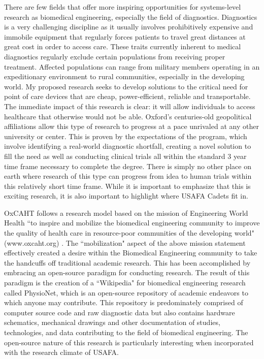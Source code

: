 \documentclass{article}
\begin{document}
There are few fields that offer more inspiring opportunities for systems-level 
research as biomedical engineering, especially the field of diagnostics.
Diagnostics is a very challenging discipline as it usually involves
prohibitively expensive and immobile equipment that regularly forces patients
to travel great distances at great cost in order to access care. These traits
currently inherent to medical diagnostics regularly exclude certain
populations from receiving proper
treatment. Affected populations can range from military members operating in an
expeditionary environment to rural communities, especially in the developing
world. My proposed research seeks to develop solutions to the critical need for
point of care devices that are cheap, power-efficient, reliable and
transportable. The immediate impact of this research is clear: it will allow
individuals to access healthcare that otherwise would not be able. Oxford's
centuries-old geopolitical affiliations allow this type of research to progress 
at a pace unrivaled at any other university or center. This is proven by the
expectations of the program, which involve identifying a real-world diagnostic 
shortfall, creating a novel solution to fill the need as well as conducting
clinical trials all within the standard 3 year time frame necessary to 
complete the degree. There is simply no other place on earth where research of
this type can progress from idea to human trials within this relatively short
time frame. While it is important to emphasize that this is exciting research, it is also
important to highlight where USAFA Cadets fit in.
 
OxCAHT follows a research model based on the mission of Engineering World
Health ``to inspire and mobilize the biomedical engineering community to improve
the quality of health care in resource-poor communities of the developing
world" (www.oxcaht.org) . The ``mobilization" aspect of the above mission
statement effectively created a desire within the Biomedical Engineering 
community to take the handcuffs off traditional academic research. This has
been accomplished by embracing an open-source paradigm for conducting research.
The result of this paradigm is the creation of a ``Wikipedia" for biomedical
engineering research called PhysioNet, which is an open-source repository of
academic endeavors to which anyone may contribute. This repository is
predominately comprised of computer source code and raw diagnostic data but
also contains hardware schematics, mechanical drawings and other documentation
of studies, technologies, and data contributing to the field of biomedical
engineering. The open-source nature of this research is particularly
interesting when incorporated with the research climate of USAFA.
 
\end{document}

